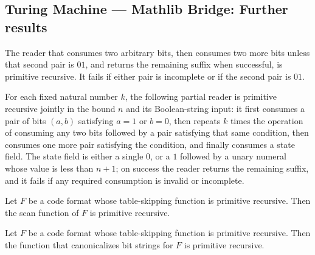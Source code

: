 \subsection*{Turing Machine --- Mathlib Bridge: Further results}

\begin{lemma}
\label{Turing.codePrimSkipWork}
\leanok
{}
The reader that consumes two arbitrary bits, then consumes two more bits unless that
second pair is $01$, and returns the remaining suffix when successful, is primitive
recursive. It fails if either pair is incomplete or if the second pair is $01$.
\end{lemma}

\begin{lemma}
\label{Turing.codePrimSkipActionK}
\leanok
{}
For each fixed natural number $k$, the following partial reader is primitive recursive
jointly in the bound $n$ and its Boolean-string input: it first consumes a pair of bits
$(a,b)$ satisfying $a=1$ or $b=0$, then repeats $k$ times the operation of consuming any
two bits followed by a pair satisfying that same condition, then consumes one more pair
satisfying the condition, and finally consumes a state field. The state field is either
a single $0$, or a $1$ followed by a unary numeral whose value is less than $n+1$; on
success the reader returns the remaining suffix, and it fails if any required
consumption is invalid or incomplete.
\end{lemma}

\begin{theorem}
\label{Turing.CodeFormat.primrec_scan}
\leanok
{}
Let $F$ be a code format whose table-skipping function is primitive recursive. Then the
scan function of $F$ is primitive recursive.
\end{theorem}

\begin{theorem}
\label{Turing.CodeFormat.primrec_canonical}
\leanok
{}
Let $F$ be a code format whose table-skipping function is primitive recursive. Then the
function that canonicalizes bit strings for $F$ is primitive recursive.
\end{theorem}

